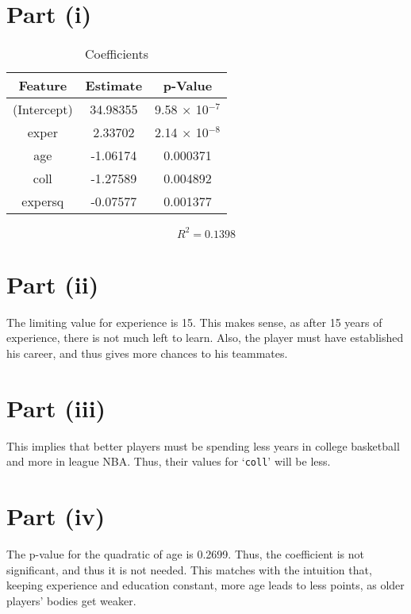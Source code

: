 \documentclass{./solution}
\author{%
    Bhavishya Desai\\[-1mm]
    160194
    \and
    Nikhil Bansal\\[-1mm]
    160447
    \and
    Nishant Maheshwari\\[-1mm]
    160458
    \and
    Harish Rajagopal\\[-1mm]
    160552
    \and
    Akhil Reddy\\[-1mm]
    160613
    \and
    Sameer Meena\\[-1mm]
    160616
}
\begin{document}
    \maketitle

    \begin{solution}[Wooldridge C6.9]
        \section*{Part (i)}
            \begin{table}[H]
                \caption{Coefficients}
                \begin{tabularx}{\textwidth}{C C C}
                    \toprule
                    Feature & Estimate & p-Value \\
                    \midrule
                    (Intercept) & 34.98355 & 9.58 $\times$ 10$^{-7}$ \\
                    exper       &  2.33702 & 2.14 $\times$ 10$^{-8}$ \\
                    age         & -1.06174 & 0.000371 \\
                    coll        & -1.27589 & 0.004892 \\
                    expersq     & -0.07577 & 0.001377 \\
                    \bottomrule
                \end{tabularx}
            \end{table}
            \vspace{-5mm}
            $$ R^2 = 0.1398 $$

        \section*{Part (ii)}
            The limiting value for experience is 15.
            This makes sense, as after 15 years of experience, there is not much left to learn.
            Also, the player must have established his career, and thus gives more chances to his teammates.

        \section*{Part (iii)}
            This implies that better players must be spending less years in college basketball and more in league NBA.\@
            Thus, their values for `\texttt{coll}' will be less.

        \section*{Part (iv)}
            The p-value for the quadratic of age is 0.2699.
            Thus, the coefficient is not significant, and thus it is not needed.
            This matches with the intuition that, keeping experience and education constant, more age leads to less points, as older players' bodies get weaker.


\end{solution}
\end{document}
